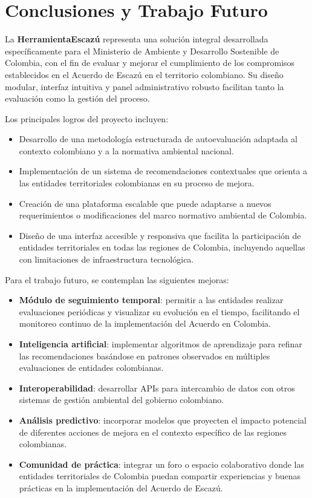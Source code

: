 \documentclass[12pt,a4paper]{report}
\begin{document}
\chapter{Conclusiones y Trabajo Futuro}
La \textbf{HerramientaEscazú} representa una solución integral desarrollada específicamente para el Ministerio de Ambiente y Desarrollo Sostenible de Colombia, con el fin de evaluar y mejorar el cumplimiento de los compromisos establecidos en el Acuerdo de Escazú en el territorio colombiano. Su diseño modular, interfaz intuitiva y panel administrativo robusto facilitan tanto la evaluación como la gestión del proceso.

Los principales logros del proyecto incluyen:
\begin{itemize}[leftmargin=*]
    \item Desarrollo de una metodología estructurada de autoevaluación adaptada al contexto colombiano y a la normativa ambiental nacional.
    \item Implementación de un sistema de recomendaciones contextuales que orienta a las entidades territoriales colombianas en su proceso de mejora.
    \item Creación de una plataforma escalable que puede adaptarse a nuevos requerimientos o modificaciones del marco normativo ambiental de Colombia.
    \item Diseño de una interfaz accesible y responsiva que facilita la participación de entidades territoriales en todas las regiones de Colombia, incluyendo aquellas con limitaciones de infraestructura tecnológica.
\end{itemize}

Para el trabajo futuro, se contemplan las siguientes mejoras:
\begin{itemize}[leftmargin=*]
    \item \textbf{Módulo de seguimiento temporal}: permitir a las entidades realizar evaluaciones periódicas y visualizar su evolución en el tiempo, facilitando el monitoreo continuo de la implementación del Acuerdo en Colombia.
    \item \textbf{Inteligencia artificial}: implementar algoritmos de aprendizaje para refinar las recomendaciones basándose en patrones observados en múltiples evaluaciones de entidades colombianas.
    \item \textbf{Interoperabilidad}: desarrollar APIs para intercambio de datos con otros sistemas de gestión ambiental del gobierno colombiano.
    \item \textbf{Análisis predictivo}: incorporar modelos que proyecten el impacto potencial de diferentes acciones de mejora en el contexto específico de las regiones colombianas.
    \item \textbf{Comunidad de práctica}: integrar un foro o espacio colaborativo donde las entidades territoriales de Colombia puedan compartir experiencias y buenas prácticas en la implementación del Acuerdo de Escazú.
\end{itemize}
\end{document}
